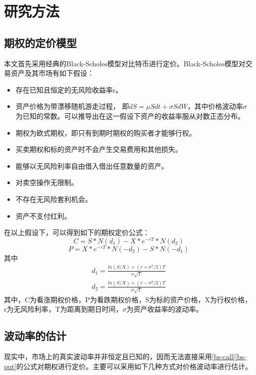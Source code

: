 \chapter{研究方法}
    \section{期权的定价模型}
    本文首先采用经典的Black-Scholes模型\cite{10.2307/1831029}对比特币进行定价。Black-Scholes模型对交易资产及其市场有如下假设：
    \begin{itemize}
        \item 存在已知且恒定的无风险收益率r。
        \item 资产价格为带漂移随机游走过程， 即$dS={\mu}Sdt+{\sigma}SdW$，其中价格波动率$\sigma$为已知的常数。可以推导出在这一假设下资产的收益率服从对数正态分布。
        \item 期权为欧式期权，即只有到期时期权的购买者才能够行权。
        \item 买卖期权和标的资产时不会产生交易费用和其他损失。
        \item 能够以无风险利率自由借入借出任意数量的资产。
        \item 对卖空操作无限制。
        \item 不存在无风险套利机会。
        \item 资产不支付红利。
    \end{itemize}
    在以上假设下，可以得到如下的期权定价公式：
    \begin{equation}\label{bs-call}
            C=S*N(d_1)-X*e^{-rT}*N(d_2) 
    \end{equation}
    \begin{equation}\label{bs-put}
        P=X*e^{-rT}*N(-d_2)-S*N(-d_1)
    \end{equation}
    其中
    \begin{equation*}
        \begin{split}
        d_1=\frac{ln(S/X)+(r+\sigma^2/2)T}{\sigma{\sqrt{T}}} \\
        d_2=\frac{ln(S/X)+(r-\sigma^2/2)T}{\sigma{\sqrt{T}}}
        \end{split}
    \end{equation*}
    其中，C为看涨期权价格，P为看跌期权价格，S为标的资产价格，X为行权价格，r为无风险利率，T为距离到期日时间，$\sigma$为资产收益率的波动率。
    
    \section{波动率的估计}
    现实中，市场上的真实波动率并非恒定且已知的，因而无法直接采用\ref{bs-call}\ref{bs-put}的公式对期权进行定价。主要可以采用如下几种方式对价格波动率进行估计。
